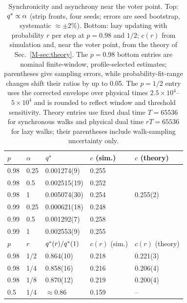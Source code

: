 \begin{table}
\caption{Synchronicity and asynchrony near the voter point. Top: $q^{*}\propto\alpha$ (strip
fronts, four seeds; errors are seed bootstrap, systematic $\approx\pm2\%$). Bottom: lazy updating
with probability $r$ per step at $p = 0.98$ and $1/2$; $c(r)$ from simulation and, near the voter
point, from the theory of Sec.~\ref{M-sec:theory}. The $p=0.98$ bottom entries
are nominal finite-window, profile-selected estimates; parentheses give
sampling errors, while probability-fit-range changes shift their ratios
by up to 0.05. The $p=1/2$ entry uses the corrected envelope over physical
times $2.5\times10^4$--$5\times10^4$ and is rounded to reflect window and
threshold sensitivity. Theory entries use fixed dual time $T=65536$
for synchronous walks and physical dual time $rT=65536$ for lazy walks;
their parentheses include walk-sampling uncertainty only.}
\label{tab:alpha}
\begin{ruledtabular}
\begin{tabular}{lllll}
$p$ & $\alpha$ & $q^{*}$ & $c$ (sim.) & $c$ (theory) \\
\hline
0.98 & 0.25 & 0.001274(9) & 0.255 & \\
0.98 & 0.5 & 0.002515(19) & 0.252 & \\
0.98 & 1 & 0.005074(30) & 0.254 & 0.255(2) \\
0.99 & 0.25 & 0.000621(18) & 0.248 & \\
0.99 & 0.5 & 0.001292(7) & 0.258 & \\
0.99 & 1 & 0.002553(9) & 0.255 & \\
\hline
$p$ & $r$ & $q^{*}(r)/q^{*}(1)$ & $c(r)$ (sim.) & $c(r)$ (theory) \\
\hline
0.98 & 1/2 & 0.864(10) & 0.218 & 0.221(3) \\
0.98 & 1/4 & 0.858(16) & 0.216 & 0.206(4) \\
0.98 & 1/8 & 0.870(12) & 0.219 & 0.200(4) \\
0.5 & 1/4 & $\approx0.86$ & 0.159 & -- \\
\end{tabular}
\end{ruledtabular}
\end{table}

